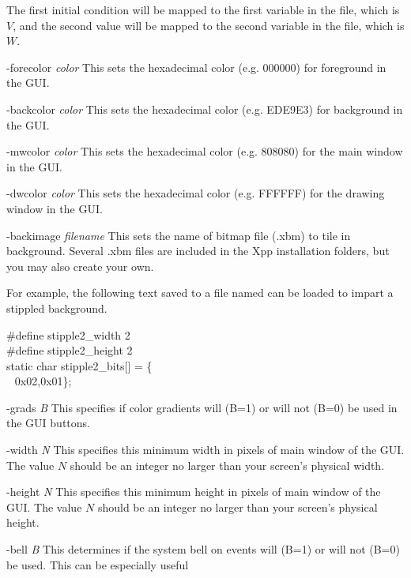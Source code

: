 \begin{description}
\begin{center}
\end{center}
The first initial condition will be mapped to the first variable in the {} file, which is $V$, and the second value will be mapped to the second variable in the {} file, which is $W$. 
\item{-forecolor \emph{color}} This sets the hexadecimal color (e.g. 000000) for foreground in the GUI.
\item{-backcolor \emph{color}} This sets the hexadecimal color (e.g. EDE9E3) for background in the GUI.
\item{-mwcolor \emph{color}} This sets the hexadecimal color (e.g. 808080) for the main window in the GUI.
\item{-dwcolor \emph{color}} This sets the hexadecimal color (e.g. FFFFFF) for the drawing window in the GUI.
\item{-backimage \emph{filename}} This sets the name of bitmap file (.xbm) to tile in background. Several .xbm files are included 
in the Xpp installation folders, but you may also create your own. 
\begin{center}\begin{minipage}{65ex}
For example, the following text saved to a file named {}
can be loaded to impart a stippled background.
\begin{center}\ttfamily\begin{minipage}{40ex}
\#define stipple2\_width 2 \\
\#define stipple2\_height 2 \\
static char stipple2\_bits[] = \{ \\
$~~$ 0x02,0x01\};
\end{minipage}\end{center}
\end{minipage}\end{center}
\item{-grads \emph{B}} This specifies if color gradients will (B=1) or will not (B=0) be used in the GUI buttons.
\item{-width  \emph{N}} This specifies this minimum width in pixels of main window of the GUI. The value $N$ should be an integer no larger than your screen's physical width.
\item{-height \emph{N}} This specifies this minimum height in pixels of main window of the GUI. The value $N$ should be an integer no larger than your screen's physical height.              
\item{-bell \emph{B}} This determines if the system bell on events will (B=1) or will not (B=0) be used.  This can be especially useful

\end{description}
